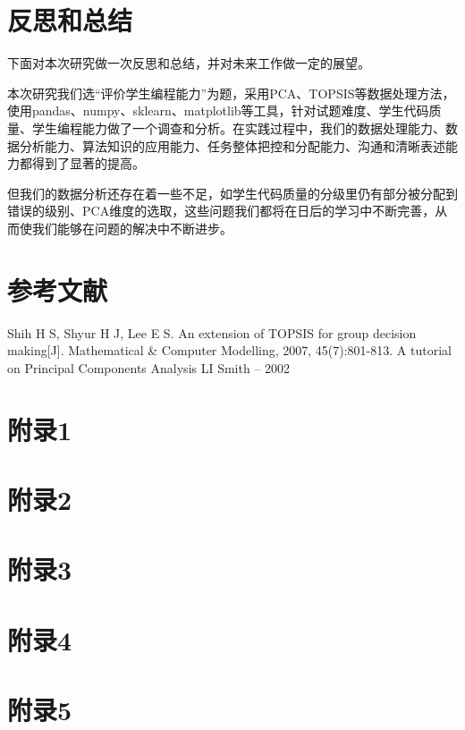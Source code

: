 \documentclass[UTF8]{ctexart}
\begin{document}
	\section{反思和总结}\label{sec5}
	下面对本次研究做一次反思和总结，并对未来工作做一定的展望。
	\par 本次研究我们选“评价学生编程能力”为题，采用PCA、TOPSIS等数据处理方法，使用pandas、numpy、sklearn、matplotlib等工具，针对试题难度、学生代码质量、学生编程能力做了一个调查和分析。在实践过程中，我们的数据处理能力、数据分析能力、算法知识的应用能力、任务整体把控和分配能力、沟通和清晰表述能力都得到了显著的提高。
	\par 但我们的数据分析还存在着一些不足，如学生代码质量的分级里仍有部分被分配到错误的级别、PCA维度的选取，这些问题我们都将在日后的学习中不断完善，从而使我们能够在问题的解决中不断进步。
	
	\section{参考文献}\label{sec:sec4}
	\small
	\begin{thebibliography}{1}
		 Shih H S, Shyur H J, Lee E S. An extension of TOPSIS for group decision making[J]. Mathematical \& Computer Modelling, 2007, 45(7):801-813.
		 A tutorial on Principal Components Analysis LI Smith – 2002
	\end{thebibliography}
	\begin{appendices} 
		\section{附录1} 
		
		\section{附录2} 
		
		\section{附录3} 
		
		
		\section{附录4} 
		
		\section{附录5} 
		
	\end{appendices}
	
\end{document}
